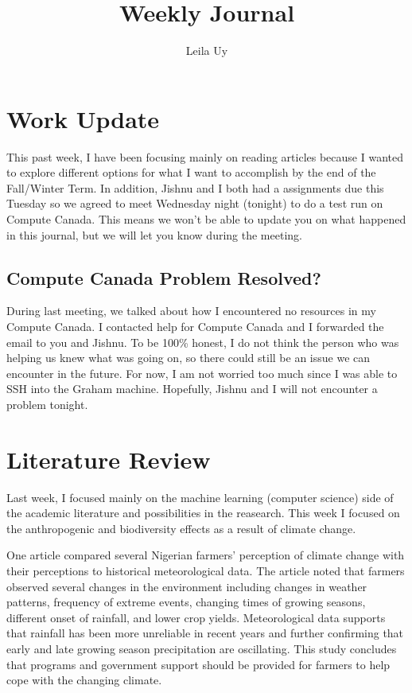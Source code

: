 \documentclass[a4paper,10pt]{article}
\title{Weekly Journal}
\author{Leila Uy}
\begin{document}
\maketitle

% 

\section{Work Update}

This past week, I have been focusing mainly on reading articles because I wanted to explore different options for what I want to accomplish by the end of the Fall/Winter Term. In addition, Jishnu and I both had a assignments due this Tuesday so we agreed to meet Wednesday night (tonight) to do a test run on Compute Canada. This means we won't be able to update you on what happened in this journal, but we will let you know during the meeting.

\subsection{Compute Canada Problem Resolved?}

During last meeting, we talked about how I encountered no resources in my Compute Canada. I contacted help for Compute Canada and I forwarded the email to you and Jishnu. To be 100\% honest, I do not think the person who was helping us knew what was going on, so there could still be an issue we can encounter in the future. For now, I am not worried too much since I was able to SSH into the Graham machine. Hopefully, Jishnu and I will not encounter a problem tonight.

\section{Literature Review}
Last week, I focused mainly on the machine learning (computer science) side of the academic literature and possibilities in the reasearch. This week I focused on the anthropogenic and biodiversity effects as a result of climate change.

One article \cite{ayanlade2017comparing} compared several Nigerian farmers' perception of climate change with their perceptions to historical meteorological data. The article noted that farmers observed several changes in the environment including changes in weather patterns, frequency of extreme events, changing times of growing seasons, different onset of rainfall, and lower crop yields. Meteorological data supports that rainfall has been more unreliable in recent years and further confirming that early and late growing season precipitation are oscillating. This study concludes that programs and government support should be provided for farmers to help cope with the changing climate. 
\end{document}
